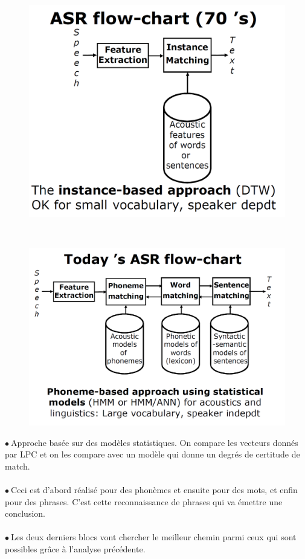 \documentclass[letterpaper, 12pt]{article}
\newcommand{\point}{$\bullet\ $}
\begin{document}
			\begin{minipage}{0.4\textwidth}
				\begin{figure}[H]
					\centering
					\includegraphics[scale=0.2]{Images/70s}
				\end{figure}\noindent
			\end{minipage}~\\
			\begin{minipage}{0.4\textwidth}
				\begin{figure}[H]
					\centering
					\includegraphics[scale=0.235]{Images/TODAYs}
				\end{figure}\noindent
			\end{minipage}\hfill
			\begin{minipage}{0.55\textwidth}
				\point Approche basée sur des modèles statistiques. On compare les vecteurs donnés par LPC
					et on les compare avec un modèle qui donne un degrés de certitude de match.\\~\\
				\point Ceci est d'abord réalisé pour des phonèmes et ensuite pour des mots, et enfin pour 
					des phrases. C'est cette reconnaissance de phrases qui va émettre une conclusion.\\~\\
				\point Les deux derniers blocs vont chercher le meilleur chemin parmi ceux qui sont possibles
					grâce à l'analyse précédente.
			\end{minipage}
\end{document}
